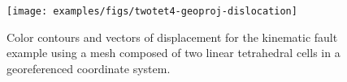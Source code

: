 \begin{figure}
  \texttt{[image: examples/figs/twotet4-geoproj-dislocation]}
  \caption{Color contours and vectors of displacement for the kinematic fault
    example using a mesh composed of two linear tetrahedral cells in a
    georeferenced coordinate system.}
  \label{fig:twotet4-geoproj-disloc}
\end{figure}



